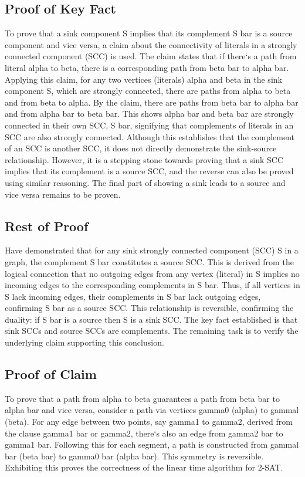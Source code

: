 \subsection*{Proof of Key Fact}
To prove that a sink component S implies that its complement S bar is a source component and vice versa, a claim about the connectivity of literals in a strongly connected component (SCC) is used.
The claim states that if there`s a path from literal alpha to beta, there is a corresponding path from beta bar to alpha bar.
Applying this claim, for any two vertices (literals) alpha and beta in the sink component S, which are strongly connected, there are paths from alpha to beta and from beta to alpha.
By the claim, there are paths from beta bar to alpha bar and from alpha bar to beta bar.
This shows alpha bar and beta bar are strongly connected in their own SCC, S bar, signifying that complements of literals in an SCC are also strongly connected.
Although this establishes that the complement of an SCC is another SCC, it does not directly demonstrate the sink-source relationship.
However, it is a stepping stone towards proving that a sink SCC implies that its complement is a source SCC, and the reverse can also be proved using similar reasoning.
The final part of showing a sink leads to a source and vice versa remains to be proven.

\subsection*{Rest of Proof}
Have demonstrated that for any sink strongly connected component (SCC) S in a graph, the complement S bar constitutes a source SCC\@.
This is derived from the logical connection that no outgoing edges from any vertex (literal) in S implies no incoming edges to the corresponding complements in S bar.
Thus, if all vertices in S lack incoming edges, their complements in S bar lack outgoing edges, confirming S bar as a source SCC\@.
This relationship is reversible, confirming the duality: if S bar is a source then S is a sink SCC\@.
The key fact established is that sink SCCs and source SCCs are complements.
The remaining task is to verify the underlying claim supporting this conclusion.

\subsection*{Proof of Claim}
To prove that a path from alpha to beta guarantees a path from beta bar to alpha bar and vice versa, consider a path via vertices gamma0 (alpha) to gammal (beta).
For any edge between two points, say gamma1 to gamma2, derived from the clause gamma1 bar or gamma2, there`s also an edge from gamma2 bar to gamma1 bar.
Following this for each segment, a path is constructed from gammal bar (beta bar) to gamma0 bar (alpha bar).
This symmetry is reversible.
Exhibiting this proves the correctness of the linear time algorithm for 2-SAT\@.

